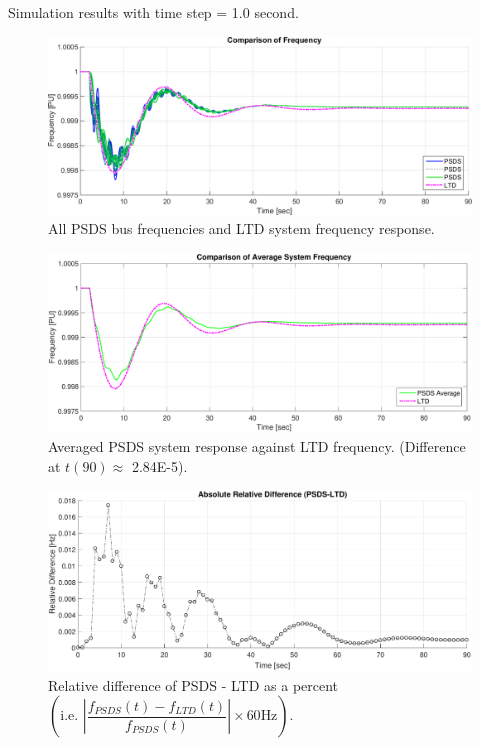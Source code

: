 \documentclass[12pt]{article}
\newcommand{\figW}{1}
\newcommand{\figH}{.26}
\begin{document}
Simulation results with time step = 1.0 second.

	\begin{figure}[h!]
			\centering
			\includegraphics[width=\figW\linewidth,height=\figH\textheight]{fcomp.png}\vspace{-1em}
			\caption{All PSDS bus frequencies and LTD system frequency response.}
			\label{fcomp}		 
	\end{figure}\vspace{-2em}
	\begin{figure}[h!]
				\centering
				\includegraphics[width=\figW\linewidth,height=\figH\textheight]{aveFg}  \vspace{-2em}
				\caption{Averaged PSDS system response against LTD frequency. (Difference at $t(90) \approx$ 2.84E-5).} 
				\label{aveF}
	\end{figure}\vspace{-2em}
	\begin{figure}[h!]	
				\centering
				\includegraphics[width=\figW\linewidth,height=\figH\textheight]{relDif}  \vspace{-1.5em}
				\caption{Relative difference of PSDS - LTD as a percent $\left( \text{i.e. }  \left|\dfrac{f_{PSDS}(t)- f_{LTD}(t)}{f_{PSDS}(t)}\right| \times 60 \text{Hz} \right)$.}
				\label{redDif}
	\end{figure}
\end{document}
